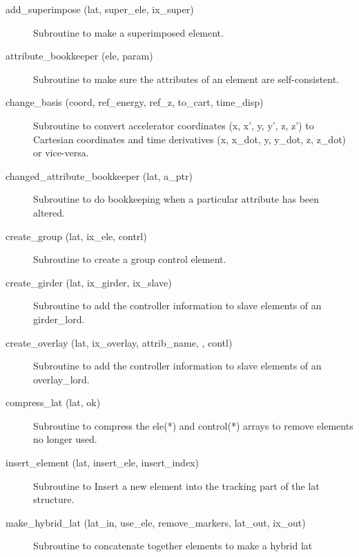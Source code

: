 \begin{description}

\item[add_superimpose (lat, super_ele, ix_super)] \Newline
Subroutine to make a superimposed element. 

\item[attribute_bookkeeper (ele, param)] \Newline
Subroutine to make sure the attributes of an element are self-consistent. 

\item[change_basis (coord, ref_energy, ref_z, to_cart, time_disp)] \Newline
Subroutine to convert accelerator coordinates (x, x', y, y', z, z') to
Cartesian coordinates and time derivatives (x, x_dot, y, y_dot, z,
z_dot) or vice-versa.

\item[changed_attribute_bookkeeper (lat, a_ptr)] \Newline 
Subroutine to do bookkeeping when a particular attribute has been altered.

\item[create_group (lat, ix_ele, contrl)] \Newline
Subroutine to create a group control element. 

\item[create_girder (lat, ix_girder, ix_slave)] \Newline 
     Subroutine to add the controller information to slave elements of
     an girder_lord.

\item[create_overlay (lat, ix_overlay, attrib_name, , contl)] \Newline
Subroutine to add the controller information to slave elements of an 
overlay_lord. 

\item[compress_lat (lat, ok)] \Newline
Subroutine to compress the ele(*) and control(*) arrays to remove
elements no longer used.

\item[insert_element (lat, insert_ele, insert_index)] \Newline
Subroutine to Insert a new element into the tracking part of the 
lat structure. 

\item[make_hybrid_lat (lat_in, use_ele, remove_markers, lat_out, ix_out)] \Newline
Subroutine to concatenate together elements to make a hybrid lat 


\end{description}
